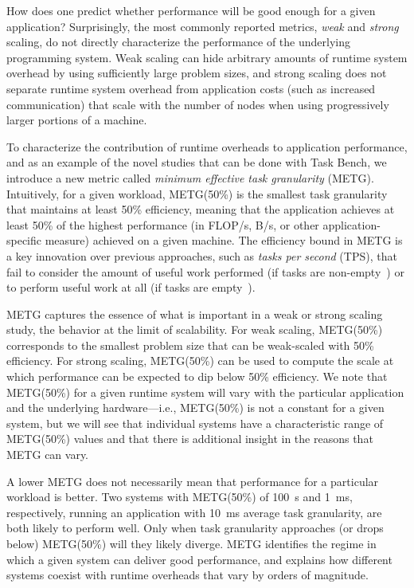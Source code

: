 How does one predict whether performance will be good enough for a given application?
Surprisingly, the most commonly reported metrics,
\emph{weak} and \emph{strong} scaling, do not directly characterize
the performance of the underlying
programming system. Weak scaling can hide arbitrary amounts of runtime
system overhead by using sufficiently large problem sizes, and strong
scaling does not separate runtime system overhead from application costs
(such as increased communication) that scale with the number of nodes when
using progressively larger portions of a machine. 

To characterize the contribution of runtime overheads
to application performance, and as an example of the novel studies that can be done
with Task Bench, we introduce a new metric called
\emph{minimum effective task granularity} (METG). Intuitively, for a given
workload, METG(50\%) is the smallest task granularity that maintains
at least 50\% efficiency, meaning that the application achieves at
least 50\% of the highest performance (in FLOP/s, B/s, or other
application-specific measure) achieved on a given
machine. The efficiency bound in METG is a key innovation over
previous approaches, such as \emph{tasks per second} (TPS), that fail
to consider the amount of useful work performed (if tasks are
non-empty~\cite{Canary16, Armstrong14}) or to perform useful work at all (if tasks are empty~\cite{LegionTracing18}).

METG captures the essence of what is important in a
weak or strong scaling study, the behavior at the limit of
scalability. For weak scaling, METG(50\%) corresponds to the
smallest problem size that can be weak-scaled with 50\%
efficiency. For strong scaling, METG(50\%) can be used to compute the
scale at which performance can be expected to dip below 50\%
efficiency.  We note that METG(50\%) for a given runtime system will
vary with the particular application and the underlying hardware---i.e., METG(50\%)
is not a constant for a given system, but we will see that individual systems have
a characteristic range of METG(50\%) values and that there is additional insight
in the reasons that METG can vary.

A lower METG does not necessarily mean that
performance for a particular workload is better. Two systems with METG(50\%) of 100~\textmu{}s and 1~ms,
respectively, running an application with 10~ms average task granularity, are both likely to perform well. Only when task
granularity approaches (or drops below) METG(50\%) will they
likely diverge. METG identifies the regime in which a
given system can deliver good performance, and explains how
different systems coexist with runtime overheads that vary by orders of magnitude.

